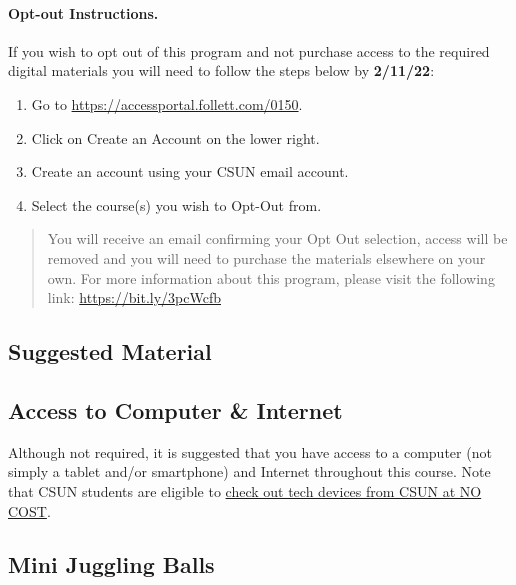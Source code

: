 \documentclass[11pt,]{article}
\providecommand{\tightlist}{%
  \setlength{\itemsep}{0pt}\setlength{\parskip}{0pt}}
\begin{document}
\hypertarget{opt-out-instructions.}{%
\paragraph{Opt-out Instructions.}\label{opt-out-instructions.}}

If you wish to opt out of this program and not purchase access to the
required digital materials you will need to follow the steps below by
\textbf{2/11/22}:

\begin{enumerate}
\def\labelenumi{\arabic{enumi}.}
\tightlist
\item
  Go to \url{https://accessportal.follett.com/0150}.
\item
  Click on Create an Account on the lower right.
\item
  Create an account using your CSUN email account.
\item
  Select the course(s) you wish to Opt-Out from.
\end{enumerate}

\begin{quote}
You will receive an email confirming your Opt Out selection, access will
be removed and you will need to purchase the materials elsewhere on your
own. For more information about this program, please visit the following
link: \url{https://bit.ly/3pcWcfb}
\end{quote}

\hypertarget{suggested-material}{%
\subsection{Suggested Material}\label{suggested-material}}

\hypertarget{access-to-computer-internet}{%
\subsection{Access to Computer \&
Internet}\label{access-to-computer-internet}}

Although not required, it is suggested that you have access to a
computer (not simply a tablet and/or smartphone) and Internet throughout
this course. Note that CSUN students are eligible to
\href{https://www.csun.edu/it/device-loaner-program}{check out tech
devices from CSUN at NO COST}.

\hypertarget{mini-juggling-balls}{%
\subsection{Mini Juggling Balls}\label{mini-juggling-balls}}
\end{document}
